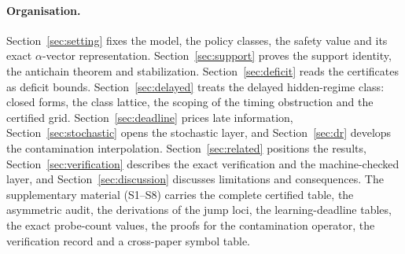 \paragraph{Organisation.}
Section~\ref{sec:setting} fixes the model, the policy classes, the safety value and its exact $\alpha$-vector representation. Section~\ref{sec:support} proves the support identity, the antichain theorem and stabilization. Section~\ref{sec:deficit} reads the certificates as deficit bounds. Section~\ref{sec:delayed} treats the delayed hidden-regime class: closed forms, the class lattice, the scoping of the timing obstruction and the certified grid. Section~\ref{sec:deadline} prices late information, Section~\ref{sec:stochastic} opens the stochastic layer, and Section~\ref{sec:dr} develops the contamination interpolation. Section~\ref{sec:related} positions the results, Section~\ref{sec:verification} describes the exact verification and the machine-checked layer, and Section~\ref{sec:discussion} discusses limitations and consequences. The supplementary material (S1--S8) carries the complete certified table, the asymmetric audit, the derivations of the jump loci, the learning-deadline tables, the exact probe-count values, the proofs for the contamination operator, the verification record and a cross-paper symbol table.

